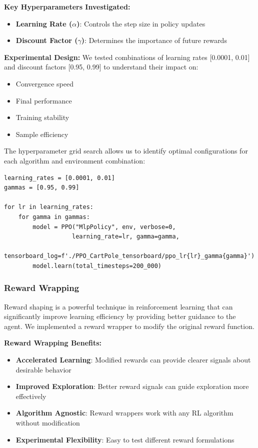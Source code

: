 \documentclass[12pt]{article}
\begin{document}
{{{\textbf{Key Hyperparameters Investigated:}
\begin{itemize}
    \item \textbf{Learning Rate ($\alpha$)}: Controls the step size in policy updates
    \item \textbf{Discount Factor ($\gamma$)}: Determines the importance of future rewards
\end{itemize}

\textbf{Experimental Design:}
We tested combinations of learning rates [0.0001, 0.01] and discount factors [0.95, 0.99] to understand their impact on:
\begin{itemize}
    \item Convergence speed
    \item Final performance
    \item Training stability
    \item Sample efficiency
\end{itemize}

The hyperparameter grid search allows us to identify optimal configurations for each algorithm and environment combination:

\begin{verbatim}
learning_rates = [0.0001, 0.01]  
gammas = [0.95, 0.99]

for lr in learning_rates:
    for gamma in gammas:
        model = PPO("MlpPolicy", env, verbose=0,
                   learning_rate=lr, gamma=gamma,
                   tensorboard_log=f'./PPO_CartPole_tensorboard/ppo_lr{lr}_gamma{gamma}')
        model.learn(total_timesteps=200_000)
\end{verbatim}

\subsubsection{Reward Wrapping}

Reward shaping is a powerful technique in reinforcement learning that can significantly improve learning efficiency by providing better guidance to the agent. We implemented a reward wrapper to modify the original reward function.

\textbf{Reward Wrapping Benefits:}
\begin{itemize}
    \item \textbf{Accelerated Learning}: Modified rewards can provide clearer signals about desirable behavior
    \item \textbf{Improved Exploration}: Better reward signals can guide exploration more effectively
    \item \textbf{Algorithm Agnostic}: Reward wrappers work with any RL algorithm without modification
    \item \textbf{Experimental Flexibility}: Easy to test different reward formulations
\end{itemize}

}}}
\end{document}
